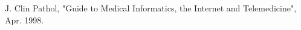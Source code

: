 \begin{thebibliography}{1}
	
	J. Clin Pathol, "Guide to Medical Informatics, the Internet and Telemedicine", Apr. 1998. 
	
\end{thebibliography}
